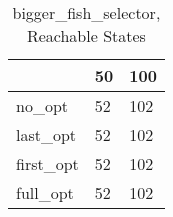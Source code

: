 \begin{table}
\caption{bigger\_fish\_selector, Reachable States}
\label{bigger_fish_selector_reach}
\begin{tabular}{lll}
\toprule
 & 50 & 100 \\
\midrule
no\_opt & 52 & 102 \\
last\_opt & 52 & 102 \\
first\_opt & 52 & 102 \\
full\_opt & 52 & 102 \\
\bottomrule
\end{tabular}
\end{table}

